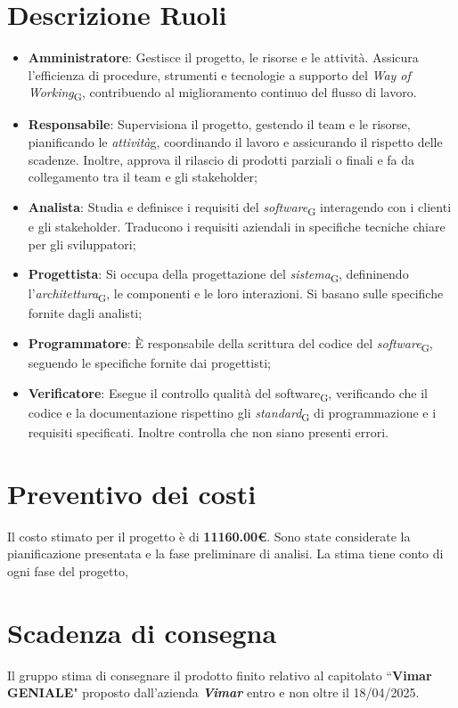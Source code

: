 \documentclass{article}
\begin{document}
\section{Descrizione Ruoli}
\begin{itemize}
    \item  \textbf{Amministratore}: Gestisce il progetto, le risorse e le attività. Assicura l'efficienza di procedure, strumenti e tecnologie a supporto del \textit{Way of Working}\textsubscript{G}, contribuendo al miglioramento continuo del flusso di lavoro.
    \item  \textbf{Responsabile}: Supervisiona il progetto, gestendo il team e le risorse, pianificando le \textit{attività}\textsubscript{}{g}, coordinando il lavoro e assicurando il rispetto delle scadenze. Inoltre, approva il rilascio di prodotti parziali o finali e fa da collegamento tra il team e gli stakeholder;
    \item  \textbf{Analista}: Studia e definisce i requisiti del \textit{software}\textsubscript{G} interagendo con i clienti e gli stakeholder. Traducono i requisiti aziendali in specifiche tecniche chiare per gli sviluppatori;
    \item  \textbf{Progettista}: Si occupa della progettazione del \textit{sistema}\textsubscript{G}, defininendo l'\textit{architettura}\textsubscript{G}, le componenti e le loro interazioni. Si basano sulle specifiche fornite dagli analisti;
    \item  \textbf{Programmatore}: È responsabile della scrittura del codice del \textit{software}\textsubscript{G}, seguendo le specifiche fornite dai progettisti;
    \item  \textbf{Verificatore}: Esegue il controllo qualità del software\textsubscript{G}, verificando che il codice e la documentazione rispettino gli \textit{standard}\textsubscript{G} di programmazione e i requisiti specificati. Inoltre controlla che non siano presenti errori.
\end{itemize}

\section{Preventivo dei costi}
Il costo stimato per il progetto è di \textbf{11160.00\euro}. Sono state considerate la pianificazione presentata e la fase preliminare di analisi.
La stima tiene conto di ogni fase del progetto,

\section{Scadenza di consegna}
Il gruppo stima di consegnare il prodotto finito relativo al capitolato “\textbf{Vimar GENIALE}" proposto dall’azienda \textit{\textbf{Vimar}} entro e non oltre il 18/04/2025.
\end{document}
